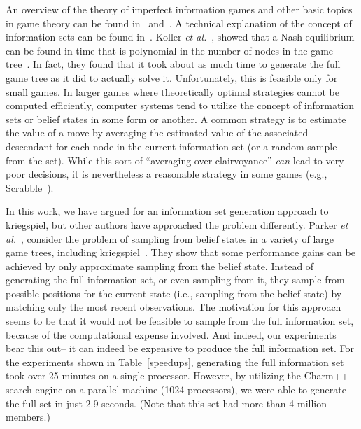 \documentclass[times, 10pt,twocolumn]{article}
\newcommand{\etal}{{\em et al.}\ }
\begin{document}
An overview of the theory of imperfect information games and other basic topics in game theory can be found
in~\cite{kuhn03lectures} and~\cite{kuhn97classics}.  A technical explanation of the concept of information sets can be
found in~\cite{gilpin07algorithms}.  Koller \etal, showed that a Nash
equilibrium can be found in time that is polynomial in the number of nodes in the game tree~\cite{koller94fast}.  In fact, they found
that it took about as much time to generate the full game tree as it did to actually solve it.  Unfortunately, this is
feasible only for small games.  In larger games where theoretically optimal strategies cannot be computed efficiently,
computer systems tend to utilize the concept of information sets or belief states in some form or another.  A common
strategy is to estimate the value of a move by averaging the estimated value of the associated descendant for each node
in the current information set (or a random sample from the set).  While this sort of ``averaging over clairvoyance''
{\em can} lead to very poor decisions, it is nevertheless a reasonable strategy in some games (e.g.,
Scrabble~\cite{sheppard02world}).

In this work, we have argued for an information set generation approach to kriegspiel, but other authors have approached
the problem differently.  Parker \etal, consider the problem of sampling from belief states in a variety of large game
trees, including kriegspiel~\cite{parker05game}.  They show that some performance gains can be achieved by only
approximate sampling from the belief state.  Instead of generating the full information set, or even sampling from it,
they sample from possible positions for the current state (i.e., sampling from the belief state) by matching only the
most recent observations.  The motivation for this approach seems to be that it would not be feasible to sample from
the full information set, because of the computational expense involved.  And indeed, our experiments bear this out-- it
can indeed be expensive to produce the full information set.  For the experiments shown in Table~\ref{speedups},
generating the full information set took over 25 minutes on a single processor.  However, by utilizing the Charm++
search engine on a parallel machine (1024 processors), we were able to generate the full set in just 2.9 seconds.  (Note
that this set had more than 4 million members.)  
\end{document}

